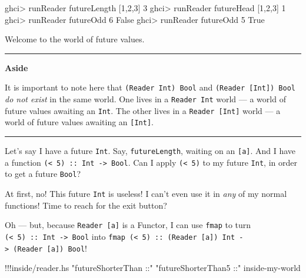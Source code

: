 \documentclass[]{article}
\newenvironment{Shaded}{}{}
\newcommand{\DataTypeTok}[1]{\textcolor[rgb]{0.56,0.13,0.00}{{#1}}}
\newcommand{\DecValTok}[1]{\textcolor[rgb]{0.25,0.63,0.44}{{#1}}}
\newcommand{\StringTok}[1]{\textcolor[rgb]{0.25,0.44,0.63}{{#1}}}
\newcommand{\FunctionTok}[1]{\textcolor[rgb]{0.02,0.16,0.49}{{#1}}}
\newcommand{\NormalTok}[1]{{#1}}
\begin{document}
\begin{Shaded}
\begin{Highlighting}[]
\NormalTok{ghci}\FunctionTok{>} \NormalTok{runReader futureLength [}\DecValTok{1}\NormalTok{,}\DecValTok{2}\NormalTok{,}\DecValTok{3}\NormalTok{]}
\DecValTok{3}
\NormalTok{ghci}\FunctionTok{>} \NormalTok{runReader futureHead [}\DecValTok{1}\NormalTok{,}\DecValTok{2}\NormalTok{,}\DecValTok{3}\NormalTok{]}
\DecValTok{1}
\NormalTok{ghci}\FunctionTok{>} \NormalTok{runReader futureOdd }\DecValTok{6}
\DataTypeTok{False}
\NormalTok{ghci}\FunctionTok{>} \NormalTok{runReader futureOdd }\DecValTok{5}
\DataTypeTok{True}
\end{Highlighting}
\end{Shaded}

Welcome to the world of future values.

\begin{center}\rule{0.5\linewidth}{\linethickness}\end{center}

\textbf{Aside}

It is important to note here that \texttt{(Reader\ Int)\ Bool} and
\texttt{(Reader\ {[}Int{]})\ Bool} \emph{do not exist} in the same
world. One lives in a \texttt{Reader\ Int} world --- a world of future
values awaiting an \texttt{Int}. The other lives in a
\texttt{Reader\ {[}Int{]}} world --- a world of future values awaiting
an \texttt{{[}Int{]}}.

\begin{center}\rule{0.5\linewidth}{\linethickness}\end{center}

Let's say I have a future \texttt{Int}. Say, \texttt{futureLength},
waiting on an \texttt{{[}a{]}}. And I have a function
\texttt{(\textless{}\ 5)\ ::\ Int\ -\textgreater{}\ Bool}. Can I apply
\texttt{(\textless{}\ 5)} to my future \texttt{Int}, in order to get a
future \texttt{Bool}?

At first, no! This future \texttt{Int} is useless! I can't even use it
in \emph{any} of my normal functions! Time to reach for the exit button?

Oh --- but, because \texttt{Reader\ {[}a{]}} is a Functor, I can use
\texttt{fmap} to turn
\texttt{(\textless{}\ 5)\ ::\ Int\ -\textgreater{}\ Bool} into
\texttt{fmap\ (\textless{}\ 5)\ ::\ (Reader\ {[}a{]})\ Int\ -\textgreater{}\ (Reader\ {[}a{]})\ Bool}!

\begin{Shaded}
\begin{Highlighting}[]
\FunctionTok{!!!}\NormalTok{inside}\FunctionTok{/}\NormalTok{reader}\FunctionTok{.}\NormalTok{hs }\StringTok{"futureShorterThan ::"} \StringTok{"futureShorterThan5 ::"} \NormalTok{inside}\FunctionTok{-}\NormalTok{my}\FunctionTok{-}\NormalTok{world}
\end{Highlighting}
\end{Shaded}
\end{document}
